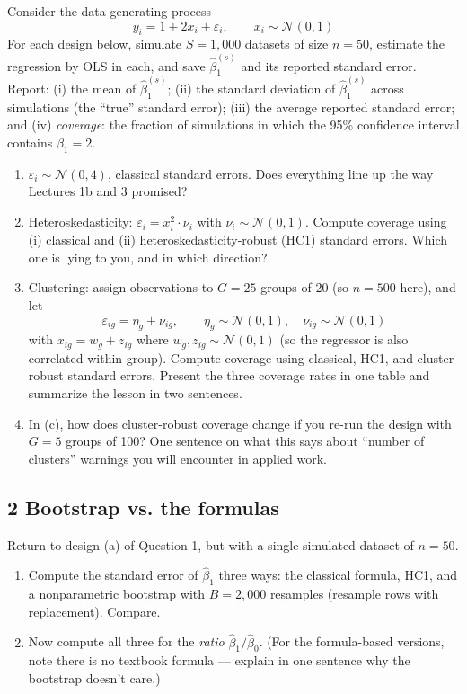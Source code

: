 \documentclass[11pt]{article}
\begin{document}
Consider the data generating process
\[
y_{i} = 1 + 2 x_{i} + \varepsilon_{i}, \qquad x_{i} \sim \mathcal{N}\left(0,1\right)
\]
For each design below, simulate $S = 1{,}000$ datasets of size $n = 50$, estimate the
regression by OLS in each, and save $\hat{\beta}_{1}^{(s)}$ and its reported standard
error. Report: (i) the mean of $\hat{\beta}_{1}^{(s)}$; (ii) the standard deviation of
$\hat{\beta}_{1}^{(s)}$ across simulations (the ``true'' standard error); (iii) the
average reported standard error; and (iv) \emph{coverage}: the fraction of simulations
in which the 95\% confidence interval contains $\beta_{1} = 2$.
\begin{enumerate}[label=(\alph*)]
\item $\varepsilon_{i} \sim \mathcal{N}\left(0, 4\right)$, classical standard errors.
Does everything line up the way Lectures 1b and 3 promised?
\item Heteroskedasticity: $\varepsilon_{i} = x_{i}^{2} \cdot \nu_{i}$ with
$\nu_{i} \sim \mathcal{N}\left(0,1\right)$. Compute coverage using (i) classical and
(ii) heteroskedasticity-robust (HC1) standard errors. Which one is lying to you, and
in which direction?
\item Clustering: assign observations to $G = 25$ groups of 20 (so $n = 500$ here), and let
\[
\varepsilon_{ig} = \eta_{g} + \nu_{ig}, \qquad \eta_{g} \sim \mathcal{N}\left(0,1\right),
\quad \nu_{ig} \sim \mathcal{N}\left(0,1\right)
\]
with $x_{ig} = w_{g} + z_{ig}$ where $w_{g}, z_{ig} \sim \mathcal{N}(0,1)$ (so the
regressor is also correlated within group). Compute coverage using classical, HC1,
and cluster-robust standard errors. Present the three coverage rates in one table and
summarize the lesson in two sentences.
\item In (c), how does cluster-robust coverage change if you re-run the design with
$G = 5$ groups of 100? One sentence on what this says about ``number of clusters''
warnings you will encounter in applied work.
\end{enumerate}

\subsection*{2 Bootstrap vs. the formulas}

Return to design (a) of Question 1, but with a single simulated dataset of $n = 50$.
\begin{enumerate}[label=(\alph*)]
\item Compute the standard error of $\hat{\beta}_{1}$ three ways: the classical formula,
HC1, and a nonparametric bootstrap with $B = 2{,}000$ resamples (resample rows with
replacement). Compare.
\item Now compute all three for the \emph{ratio} $\hat{\beta}_{1} / \hat{\beta}_{0}$.
(For the formula-based versions, note there is no textbook formula --- explain in one
sentence why the bootstrap doesn't care.)
\end{enumerate}
\end{document}
